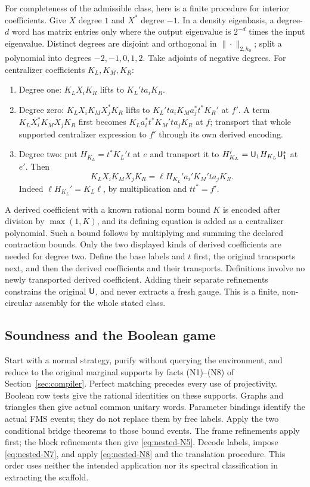 For completeness of the admissible class, here is a finite procedure for
interior coefficients. Give $X$ degree $1$ and $X^*$ degree $-1$.
In a density eigenbasis, a degree-$d$ word has matrix entries only where
the output eigenvalue is $2^{-d}$ times the input eigenvalue. Distinct
degrees are disjoint and orthogonal in $\|\cdot\|_{2,h_0}$; split a
polynomial into degrees $-2,-1,0,1,2$. Take adjoints of negative degrees.
For centralizer coefficients ${K_L},{K_M},{K_R}$:
\begin{enumerate}
\item Degree one: ${K_L}X_i{K_R}$ lifts to ${K_L}'ta_i{K_R}$.
\item Degree zero: ${K_L}X_i{K_M}X_j^*{K_R}$ lifts to
${K_L}'ta_i{K_M}a_j^*t^*{K_R}'$ at $f'$. A term ${K_L}X_i^*{K_M}X_j{K_R}$ first becomes
${K_L}a_i^*t^*{K_M}'ta_j{K_R}$ at $f$; transport that whole supported centralizer
expression to $f'$ through its own derived encoding.
\item Degree two: put $H_{K_L}=t^*{K_L}'t$ at $e$ and transport it to
$H_{K_L}'={\mathsf U}_1H_{K_L}{\mathsf U}_1^*$ at $e'$. Then
\[
             {K_L}X_i{K_M}X_j{K_R}=\ell H_{K_L}'a_i'{K_M}'ta_j{K_R}.
\]
Indeed $\ell H_{K_L}'={K_L}\ell$, by multiplication and $tt^*=f'$.
\end{enumerate}
A derived coefficient with a known rational norm bound $K$ is encoded
after division by $\max(1,K)$, and its defining equation is added as a
centralizer polynomial. Such a bound follows by multiplying and summing
the declared contraction bounds. Only the two displayed kinds of derived
coefficients are needed for degree two. Define the base labels and $t$
first, the original transports next, and then the derived coefficients
and their transports. Definitions involve no newly transported derived
coefficient. Adding their
separate refinements constrains the original
${\mathsf U}$, and never extracts a fresh gauge. This is a finite, non-circular
assembly for the whole stated class.

\subsection{Soundness and the Boolean game}
Start with a normal strategy, purify without querying the environment,
and reduce to the original marginal supports by facts (N1)--(N8) of Section~\ref{sec:compiler}. Perfect matching precedes every use of projectivity. Boolean
row tests give the rational identities on these supports. Graphs and
triangles then give actual common unitary words. Parameter bindings
identify the actual FMS events; they do not replace them by free labels.
Apply the two conditional bridge theorems to those bound events. The
frame refinements apply first; the block refinements then give \eqref{eq:nested-N5}.
Decode labels, impose \eqref{eq:nested-N7}, and apply \eqref{eq:nested-N8} and the translation procedure.
This order uses neither the intended application nor its spectral
classification in extracting the scaffold.

